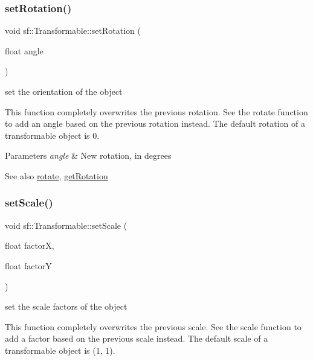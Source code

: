 \subsubsection{\texorpdfstring{set\+Rotation()}{setRotation()}}
{\footnotesize\ttfamily void sf\+::\+Transformable\+::set\+Rotation (\begin{DoxyParamCaption}\item[{float}]{angle }\end{DoxyParamCaption})}



set the orientation of the object 

This function completely overwrites the previous rotation. See the rotate function to add an angle based on the previous rotation instead. The default rotation of a transformable object is 0.


\begin{DoxyParams}{Parameters}
{\em angle} & New rotation, in degrees\\
\hline
\end{DoxyParams}
\begin{DoxySeeAlso}{See also}
\hyperlink{classsf_1_1_transformable_af8a5ffddc0d93f238fee3bf8efe1ebda}{rotate}, \hyperlink{classsf_1_1_transformable_aa00b5c5d4a06ac24a94dd72c56931d3a}{get\+Rotation} 
\end{DoxySeeAlso}
\mbox{\label{classsf_1_1_transformable_aaec50b46b3f41b054763304d1e727471}} 
\subsubsection{\texorpdfstring{set\+Scale()}{setScale()}\hspace{0.1cm}{\footnotesize\ttfamily [1/2]}}
{\footnotesize\ttfamily void sf\+::\+Transformable\+::set\+Scale (\begin{DoxyParamCaption}\item[{float}]{factorX,  }\item[{float}]{factorY }\end{DoxyParamCaption})}



set the scale factors of the object 

This function completely overwrites the previous scale. See the scale function to add a factor based on the previous scale instead. The default scale of a transformable object is (1, 1).


